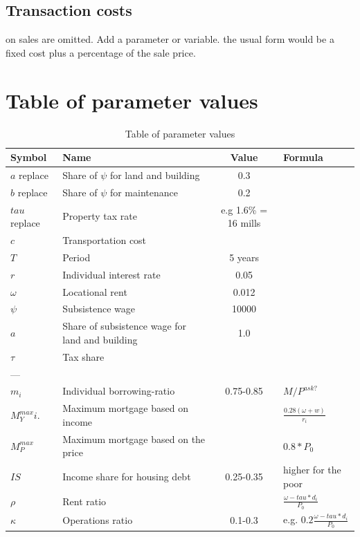 \subsection{Transaction costs} on sales are omitted. Add a parameter or variable. the usual form  would be a fixed cost  plus a percentage of the sale price.

\newpage
\section{Table of parameter values}
\renewcommand{\arraystretch}{2}
\begin{longtable}{lp{5cm}cp{2.5cm}}
\caption{Table of parameter values}\label{tab:parameters}\\
\hline 
Symbol         & Name                                 & Value      & Formula  \\ \hline
$a$ replace    & Share of $\psi$ for land and building &   0.3         & \\
$b$ replace    & Share of $\psi$ for maintenance       &   0.2         & \\
$tau$ replace  & Property tax rate &  e.g 1.6\% = 16 mills             & \\
$c$       & Transportation cost & \\
$T$       & Period & 5 years      \\
$r$       & Individual interest rate & 0.05 \\
$\omega$  & Locational rent & 0.012  \\
$\psi$    & Subsistence wage & 10000 \\
$a$       & Share of subsistence wage for land and building & 1.0 \\
$\tau$       & Tax share & \\

---       &  & \\
$m_i$          & Individual borrowing-ratio           & 0.75-0.85  & $M/P^{ask?}$ \\
$M^{max}_Yi$.  & Maximum mortgage based on income     &            & $\frac{0.28(\omega+w)}{r_i}$ \\
 $M^{max}_P$   & Maximum mortgage based on the price  &            & $0.8*P_0$ \\
$IS$           & Income share for housing debt        & 0.25-0.35  & higher for the poor \\
$\rho$         & Rent ratio                           &            & $\frac{\omega-tau*d_i}{P_0}$ \\
$\kappa $      & Operations ratio                     & 0.1-0.3    & e.g. $ 0.2\frac{\omega-tau*d_i}{P_0}$ \\


\end{longtable}
